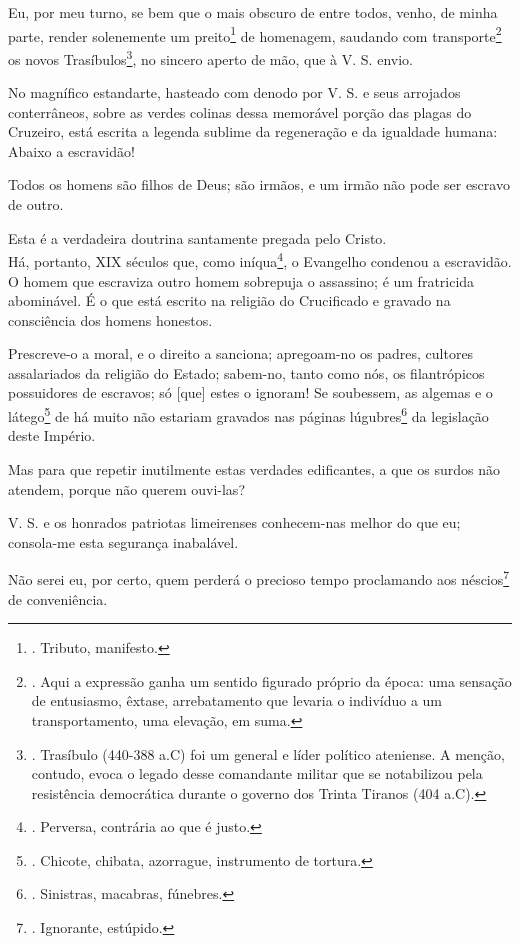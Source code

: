 Eu, por meu turno, se bem que o mais obscuro de entre todos, venho, de
minha parte, render solenemente um preito\footnote{. Tributo, manifesto.}
de homenagem, saudando com transporte\footnote{. Aqui a expressão ganha
  um sentido figurado próprio da época: uma sensação de entusiasmo,
  êxtase, arrebatamento que levaria o indivíduo a um transportamento,
  uma elevação, em suma.} os novos Trasíbulos\footnote{. Trasíbulo
  (440-388 a.C) foi um general e líder político ateniense. A menção,
  contudo, evoca o legado desse comandante militar que se notabilizou
  pela resistência democrática durante o governo dos Trinta Tiranos (404
  a.C).}, no sincero aperto de mão, que à V. S. envio.

No magnífico estandarte, hasteado com denodo por V. S. e seus arrojados
conterrâneos, sobre as verdes colinas dessa memorável porção das plagas
do Cruzeiro, está escrita a legenda sublime da regeneração e da
igualdade humana: Abaixo a escravidão!

Todos os homens são filhos de Deus; são irmãos, e um irmão não pode ser
escravo de outro.

Esta é a verdadeira doutrina santamente pregada pelo Cristo.\\
Há, portanto, XIX séculos que, como iníqua\footnote{. Perversa,
  contrária ao que é justo.}, o Evangelho condenou a escravidão.\\
O homem que escraviza outro homem sobrepuja o assassino; é um fratricida
abominável. É o que está escrito na religião do Crucificado e gravado na
consciência dos homens honestos.

Prescreve-o a moral, e o direito a sanciona; apregoam-no os padres,
cultores assalariados da religião do Estado; sabem-no, tanto como nós,
os filantrópicos possuidores de escravos; só {[}que{]} estes o ignoram!
Se soubessem, as algemas e o látego\footnote{. Chicote, chibata,
  azorrague, instrumento de tortura.} de há muito não estariam gravados
nas páginas lúgubres\footnote{. Sinistras, macabras, fúnebres.} da
legislação deste Império.

Mas para que repetir inutilmente estas verdades edificantes, a que os
surdos não atendem, porque não querem ouvi-las?

V. S. e os honrados patriotas limeirenses conhecem-nas melhor do que eu;
consola-me esta segurança inabalável.

Não serei eu, por certo, quem perderá o precioso tempo proclamando aos
néscios\footnote{. Ignorante, estúpido.} de conveniência.

